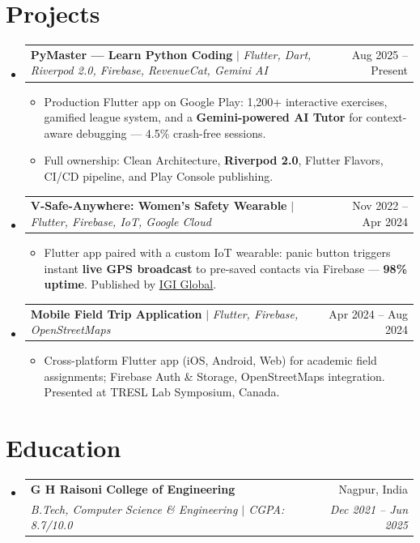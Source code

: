 \documentclass[letterpaper,10pt]{article}
\makeatletter
\newcommand{\resumeItem}[1]{
  \item\small{{#1 \vspace{-2pt}}}
}
\newcommand{\resumeSubheading}[4]{
  \vspace{-1pt}\item
    \begin{tabular*}{0.97\textwidth}[t]{l@{\extracolsep{\fill}}r}
      \textbf{#1} & \small #2 \\
      \textit{\small #3} & \textit{\small #4} \\
    \end{tabular*}\vspace{-6pt}
}
\newcommand{\resumeProjectHeading}[2]{
  \item
    \begin{tabular*}{0.97\textwidth}{l@{\extracolsep{\fill}}r}
      \small #1 & \small #2 \\
    \end{tabular*}\vspace{-6pt}
}
\newcommand{\resumeSubHeadingListStart}{\begin{itemize}[leftmargin=0.13in, label={}]}
\newcommand{\resumeSubHeadingListEnd}{\end{itemize}}
\newcommand{\resumeItemListStart}{\begin{itemize}[leftmargin=0.18in]}
\newcommand{\resumeItemListEnd}{\end{itemize}\vspace{-4pt}}
\makeatother
\begin{document}
\section{Projects}
\resumeSubHeadingListStart

  \resumeProjectHeading
    {\textbf{PyMaster — Learn Python Coding} $|$ \emph{Flutter, Dart, Riverpod 2.0, Firebase, RevenueCat, Gemini AI}}{Aug 2025 -- Present}
    \resumeItemListStart
      \resumeItem{Production Flutter app on Google Play: 1,200+ interactive exercises, gamified league system, and a \textbf{Gemini-powered AI Tutor} for context-aware debugging — 4.5\% crash-free sessions.}
      \resumeItem{Full ownership: Clean Architecture, \textbf{Riverpod 2.0}, Flutter Flavors, CI/CD pipeline, and Play Console publishing.}
    \resumeItemListEnd

  \resumeProjectHeading
    {\textbf{V-Safe-Anywhere: Women's Safety Wearable} $|$ \emph{Flutter, Firebase, IoT, Google Cloud}}{Nov 2022 -- Apr 2024}
    \resumeItemListStart
      \resumeItem{Flutter app paired with a custom IoT wearable: panic button triggers instant \textbf{live GPS broadcast} to pre-saved contacts via Firebase — \textbf{98\% uptime}. Published by \href{https://www.igi-global.com/chapter/v-safe-anywhere/342150}{\underline{IGI Global}}.}
    \resumeItemListEnd

  \resumeProjectHeading
    {\textbf{Mobile Field Trip Application} $|$ \emph{Flutter, Firebase, OpenStreetMaps}}{Apr 2024 -- Aug 2024}
    \resumeItemListStart
      \resumeItem{Cross-platform Flutter app (iOS, Android, Web) for academic field assignments; Firebase Auth \& Storage, OpenStreetMaps integration. Presented at TRESL Lab Symposium, Canada.}
    \resumeItemListEnd

\resumeSubHeadingListEnd
\vspace{-2pt}

\section{Education}
\resumeSubHeadingListStart
  \resumeSubheading
    {G H Raisoni College of Engineering}{Nagpur, India}
    {B.Tech, Computer Science \& Engineering $|$ CGPA: 8.7/10.0}{Dec 2021 -- Jun 2025}
\resumeSubHeadingListEnd
\vspace{-2pt}

\end{document}
